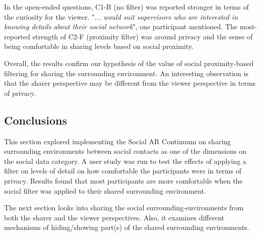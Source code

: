 In the open-ended questions, C1-B (no filter) was reported stronger in terms of the curiosity for the viewer. "\textit{... would suit supervisors who are interested in knowing details about their social network}", one participant mentioned. The most-reported strength of C2-F (proximity filter) was around privacy and the sense of being comfortable in sharing levels based on social proximity. 

Overall, the results confirm our hypothesis of the value of social proximity-based filtering for sharing the surrounding environment. An interesting observation is that the sharer perspective may be different from the viewer perspective in terms of privacy. 


\subsection{Conclusions}

This section explored implementing the Social AR Continuum on sharing surrounding environments between social contacts as one of the dimensions on the social data category. A user study was run to test the effects of applying a filter on levels of detail on how comfortable the participants were in terms of privacy. Results found that most participants are more comfortable when the social filter was applied to their shared surrounding environment.

The next section looks into sharing the social surrounding-environments from both the sharer and the viewer perspectives. Also, it examines different mechanisms of hiding/showing part(s) of the shared surrounding environments. 